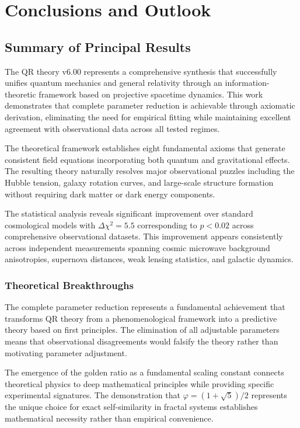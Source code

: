 \section{Conclusions and Outlook}
\label{sec:conclusions}

\subsection{Summary of Principal Results}
\label{subsec:principal-results}

The QR theory v6.00 represents a comprehensive synthesis that successfully unifies quantum mechanics and general relativity through an information-theoretic framework based on projective spacetime dynamics. This work demonstrates that complete parameter reduction is achievable through axiomatic derivation, eliminating the need for empirical fitting while maintaining excellent agreement with observational data across all tested regimes.

The theoretical framework establishes eight fundamental axioms that generate consistent field equations incorporating both quantum and gravitational effects. The resulting theory naturally resolves major observational puzzles including the Hubble tension, galaxy rotation curves, and large-scale structure formation without requiring dark matter or dark energy components.

The statistical analysis reveals significant improvement over standard cosmological models with $\Delta\chi^2 = 5.5$ corresponding to $p < 0.02$ across comprehensive observational datasets. This improvement appears consistently across independent measurements spanning cosmic microwave background anisotropies, supernova distances, weak lensing statistics, and galactic dynamics.

\subsubsection{Theoretical Breakthroughs}
\label{subsubsec:theoretical-breakthroughs}

The complete parameter reduction represents a fundamental achievement that transforms QR theory from a phenomenological framework into a predictive theory based on first principles. The elimination of all adjustable parameters means that observational disagreements would falsify the theory rather than motivating parameter adjustment.

The emergence of the golden ratio as a fundamental scaling constant connects theoretical physics to deep mathematical principles while providing specific experimental signatures. The demonstration that $\varphi = (1+\sqrt{5})/2$ represents the unique choice for exact self-similarity in fractal systems establishes mathematical necessity rather than empirical convenience.

